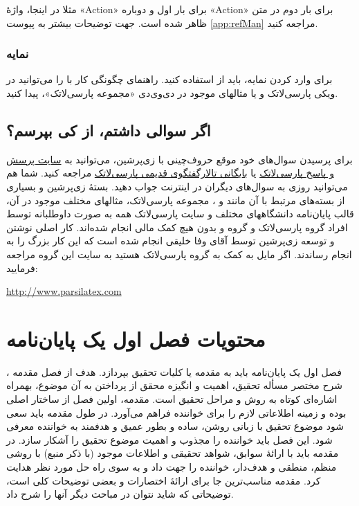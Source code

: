 مثلا در اینجا، واژهٔ
«\gls{Action}»
برای بار اول و دوباره
«\gls{Action}»
برای بار دوم در متن ظاهر شده است.
جهت توضیحات بیشتر به پیوست
\ref{app:refMan}
مراجعه کنید.
\subsubsection{نمایه}
برای وارد کردن نمایه، باید از 
استفاده کنید. 
راهنمای چگونگی کار با 
را می‌توانید در ویکی پارسی‌لاتک و یا مثالهای موجود در دی‌وی‌دی «مجموعه پارسی‌لاتک»، پیدا کنید.

\subsection{اگر سوالی داشتم، از کی بپرسم؟}
برای پرسیدن سوال‌های خود موقع حروف‌چینی با زی‌پرشین، می‌توانید به
\href{http://qa.parsilatex.com}{سایت پرسش و پاسخ پارسی‌لاتک}%
یا
\href{http://forum.parsilatex.com}{بایگانی تالارگفتگوی قدیمی پارسی‌لاتک}%
مراجعه کنید. شما هم می‌توانید روزی به سوال‌های دیگران در اینترنت جواب دهید.
بستهٔ زی‌پرشین و بسیاری از بسته‌های مرتبط با آن مانند
 و
،
مجموعه پارسی‌لاتک، مثالهای مختلف موجود در آن، قالب پایان‌نامه دانشگاههای مختلف و سایت پارسی‌لاتک همه به صورت داوطلبانه توسط افراد گروه پارسی‌لاتک و گروه
و بدون هیچ کمک مالی انجام شده‌اند. کار اصلی نوشتن و توسعه زی‌پرشین توسط آقای وفا خلیقی انجام شده است که این کار بزرگ را به انجام رساندند.
اگر مایل به کمک به گروه پارسی‌لاتک هستید به سایت این گروه مراجعه فرمایید:
\begin{center}
	\url{http://www.parsilatex.com}
\end{center}

\section{محتویات فصل اول یک پایان‌نامه}
فصل اول یک پایان‌نامه باید به مقدمه یا کلیات تحقیق بپردازد.
هدف از فصل مقدمه%
،
شرح مختصر مسأله تحقیق، اهمیت و انگیزه محقق از پرداختن به آن موضوع، بهمراه اشاره‌ای کوتاه به روش و مراحل تحقیق است. مقدمه، اولین فصل از ساختار اصلی \پ بوده و زمینه اطلاعاتی لازم را برای خواننده فراهم می‌آورد. در طول مقدمه باید سعی شود موضوع تحقیق با زبانی روشن، ساده و بطور عمیق و هدفمند به خواننده معرفی شود. این فصل باید خواننده را مجذوب و اهمیت موضوع تحقیق را آشکار سازد. در مقدمه باید با ارائهٔ سوابق، شواهد تحقیقی و اطلاعات موجود (با ذکر منبع) با روشی منظم، منطقی و هدف‌دار، خواننده را جهت داد و به سوی راه حل مورد نظر هدایت کرد. مقدمه مناسب‌ترین جا برای ارائهٔ اختصارات و بعضی توضیحات کلی است، توضیحاتی که شاید نتوان در مباحث دیگر آنها را شرح داد.

